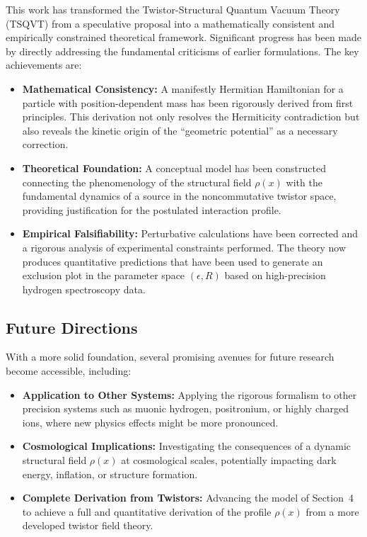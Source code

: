 \documentclass[a4paper]{article}
\begin{document}
This work has transformed the Twistor-Structural Quantum Vacuum Theory (TSQVT)\cite{Makraini2025} from a speculative proposal into a mathematically consistent and empirically constrained theoretical framework. Significant progress has been made by directly addressing the fundamental criticisms of earlier formulations. The key achievements are:

\begin{itemize}
	\item \textbf{Mathematical Consistency:} A manifestly Hermitian Hamiltonian for a particle with position-dependent mass has been rigorously derived from first principles. This derivation not only resolves the Hermiticity contradiction but also reveals the kinetic origin of the ``geometric potential'' as a necessary correction.
	
	\item \textbf{Theoretical Foundation:} A conceptual model has been constructed connecting the phenomenology of the structural field $\rho(x)$ with the fundamental dynamics of a source in the noncommutative twistor space, providing justification for the postulated interaction profile.
	
	\item \textbf{Empirical Falsifiability:} Perturbative calculations have been corrected and a rigorous analysis of experimental constraints performed. The theory now produces quantitative predictions that have been used to generate an exclusion plot in the parameter space $(\epsilon, R)$ based on high-precision hydrogen spectroscopy data.
\end{itemize}

\subsection{Future Directions}

With a more solid foundation, several promising avenues for future research become accessible, including:

\begin{itemize}
	\item \textbf{Application to Other Systems:} Applying the rigorous formalism to other precision systems such as muonic hydrogen, positronium, or highly charged ions, where new physics effects might be more pronounced.
	
	\item \textbf{Cosmological Implications:} Investigating the consequences of a dynamic structural field $\rho(x)$ at cosmological scales, potentially impacting dark energy, inflation, or structure formation.
	
	\item \textbf{Complete Derivation from Twistors:} Advancing the model of Section~4 to achieve a full and quantitative derivation of the profile $\rho(x)$ from a more developed twistor field theory.
\end{itemize}




\end{document}
